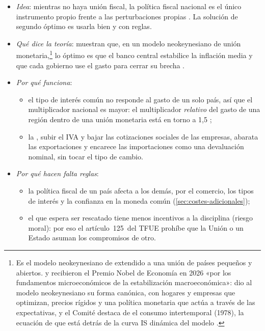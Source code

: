\documentclass[11pt]{article}
\begin{document}
\begin{itemize}
\item \emph{Idea}: mientras no haya unión fiscal, la política fiscal nacional es el único instrumento propio frente a las perturbaciones propias . La solución de segundo óptimo es usarla bien y con reglas.
\item \emph{Qué dice la teoría}: \textcite{GaliMonacelli2008Optimal} muestran que, en un modelo neokeynesiano de unión monetaria,\footnote{Es el modelo neokeynesiano de \textcite{Woodford2003Interest} extendido a una unión de países pequeños y abiertos.  y  recibieron el Premio Nobel de Economía en 2026 «por los fundamentos microeconómicos de la estabilización macroeconómica»\nocite{Nobel2026Prensa}:  dio al modelo neokeynesiano su forma canónica, con hogares y empresas que optimizan, precios rígidos y una política monetaria que actúa a través de las expectativas, y el Comité destaca de  el consumo intertemporal (1978), la ecuación de  que está detrás de la curva IS dinámica del modelo .} lo óptimo es que el banco central estabilice la inflación media y que cada gobierno use el gasto para cerrar su brecha .
\item \emph{Por qué funciona}:
  \begin{itemize}
  \item el tipo de interés común no responde al gasto de un solo país, así que el multiplicador nacional es mayor: el multiplicador \emph{relativo} del gasto de una región dentro de una unión monetaria está en torno a 1,5\nocite{NakamuraSteinsson2014} ;
  \item la , subir el IVA y bajar las cotizaciones sociales de las empresas, abarata las exportaciones y encarece las importaciones como una devaluación nominal, sin tocar el tipo de cambio\nocite{FarhiGopinathItskhoki2014}.
  \end{itemize}
\item \emph{Por qué hacen falta reglas}:
  \begin{itemize}
  \item la política fiscal de un país afecta a los demás, por el comercio, los tipos de interés y la confianza en la moneda común (\ref{sec:costes-adicionales});
  \item el que espera ser rescatado tiene menos incentivos a la disciplina (riesgo moral): por eso el artículo~125~del TFUE prohíbe que la Unión o un Estado asuman los compromisos de otro\nocite{TFUE2016}.

\end{itemize}
\end{itemize}
\end{document}

